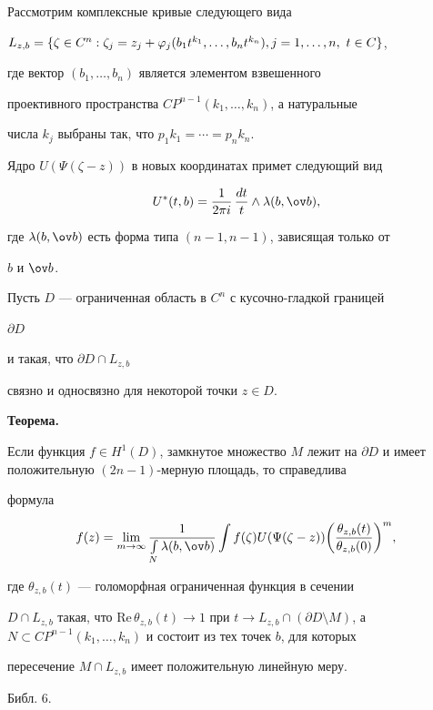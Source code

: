  


Рассмотрим комплексные кривые следующего вида 


$L_{z,b}=\{\zeta\in C^n:\zeta_j=z_j+\varphi_j(b_1t^{k_1} 


,\dotsc,b_n t^{k_n}),\linebreak j=1,\dotsc,n, \ t\in C\}$, 


где вектор $(b_1,\dotsc,b_n)$ является элементом взвешенного 


проективного пространства $C P^{n-1}(k_1,\dotsc,k_n)$, а натуральные 


числа $k_j$ выбраны так, что $p_1k_1=\dotsb=p_n k_n$. 


 


Ядро $U(\Psi(\zeta-z))$ в новых координатах примет следующий вид 


$$ 


U^*(t,b)=\frac{1}{2\pi i}\,\frac{dt}{t}\wedge 


\lambda(b,\ov b), 


$$ 


где $\lambda(b,\ov b)$ есть форма типа $(n-1,n-1)$, зависящая только от 


$b$ и $\ov b$. 





Пусть $D$ --- ограниченная область в $C^n$ с кусочно-гладкой границей


$\partial D$


и такая, что $\partial D\cap L_{z,b}$


связно и односвязно для некоторой точки $z\in D$.


\medskip 


 


{\bf Теорема.}{\it 


Если функция $f\in H^1(D)$, замкнутое множество $M$ лежит на $\partial 


D$ и имеет положительную $(2n-1)$-мерную площадь, то справедлива 


формула 


$$ 


f(z)=\lim_{m\to\infty} 


\frac{1}{\int\limits_N \lambda(b,\ov b)} 


\int f(\zeta)U(\Psi(\zeta-z))\bigg( 


\frac{\theta_{z,b}(t)}{\theta_{z,b}(0)}\bigg)^m, 


$$ 


где $\theta_{z,b}(t)$ --- голоморфная ограниченная функция в сечении 


$D\cap L_{z,b}$ такая, что $\mathrm{Re}\,\theta_{z,b}(t)\to1$ при $t\to 


L_{z,b}\cap(\partial D\setminus M)$, а $N\subset C 


P^{n-1}(k_1,\dotsc,k_n)$ и состоит из тех точек $b$, для которых


пересечение $M\cap L_{z,b}$ имеет положительную линейную меру. 


} Библ. 6. 


